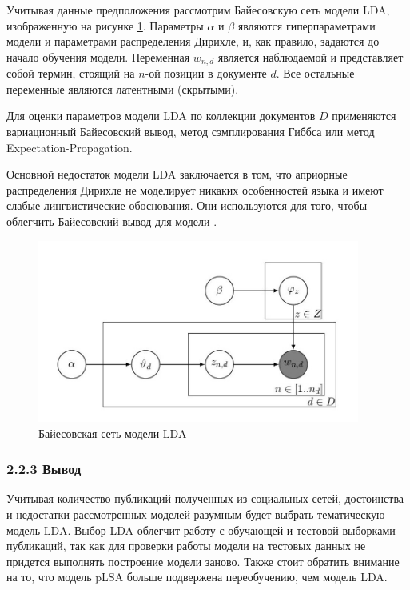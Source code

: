 \documentclass[a4paper]{report}
\begin{document}
	Учитывая данные предположения рассмотрим Байесовскую сеть модели LDA, изображенную на рисунке \ref{fig:lda}. Параметры $\alpha$ и $\beta$ являются гиперпараметрами модели и параметрами распределения Дирихле, и, как правило, задаются до начало обучения модели. Переменная $w_{n,d}$ является наблюдаемой и представляет собой термин, стоящий на $n$-ой позиции в документе $d$. Все остальные переменные являются латентными (скрытыми).
	
	Для оценки параметров модели LDA по коллекции документов $D$ применяются вариационный Байесовский вывод, метод сэмплирования Гиббса или метод Expectation-Propagation.
	
	Основной недостаток модели LDA заключается в том, что априорные распределения Дирихле не моделирует никаких особенностей языка и имеют слабые лингвистические обоснования. Они используются для того, чтобы облегчить Байесовский вывод для модели \cite{bib:Voron1}.
	
	
	
	\begin{figure}
		\centering
		\includegraphics[width=400px]
		{imgs/LDA.jpg}
		\caption{Байесовская сеть модели LDA}
		\label{fig:lda}
	\end{figure} 
	
	
	
	
	\subsubsection{2.2.3 Вывод}
	Учитывая количество публикаций полученных из социальных сетей, достоинства и недостатки рассмотренных моделей разумным будет выбрать тематическую модель LDA. Выбор LDA облегчит работу с обучающей и тестовой выборками публикаций, так как для проверки работы модели на тестовых данных не придется выполнять построение модели заново.  Также стоит обратить внимание на то, что модель pLSA больше подвержена переобучению, чем модель LDA.
	
\end{document}
